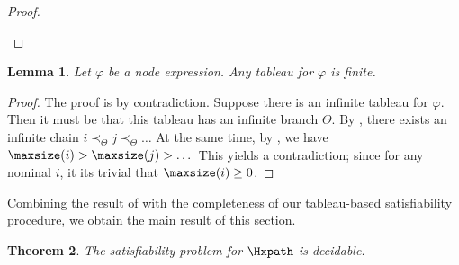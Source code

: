 \documentclass[10pt,a4paper]{amsart}
\newtheorem{thm}{Theorem}[section]
\newtheorem{lem}[thm]{Lemma}
\theoremstyle{definition}
\theoremstyle{remark}
\begin{document}
\begin{proof}
\begin{description}

  \end{description}
\end{proof}

\begin{lem} \label{prop:termination}	
  Let $\varphi$ be a node expression.
  Any tableau for $\varphi$ is finite.
\end{lem}
\begin{proof}
  The proof is by contradiction. Suppose there is an infinite tableau for $\varphi$. Then it must be that this tableau has an infinite branch $\Theta$.
  By , there exists an infinite chain
  $
   i \prec_\Theta j \prec_\Theta \dots  
  $
  At the same time, by , we have 
  $
    \maxsize(i) > \maxsize(j) > \dots  
  $
  This yields a contradiction; since for any nominal $i$, it its trivial that $\maxsize(i) \geq 0$.
\end{proof}

Combining the result of  with the completeness of our tableau-based satisfiability procedure, we obtain the main result of this section.

\begin{thm}\label{th:decidability}
  The satisfiability problem for $\Hxpath$ is decidable.
\end{thm}
\end{document}

